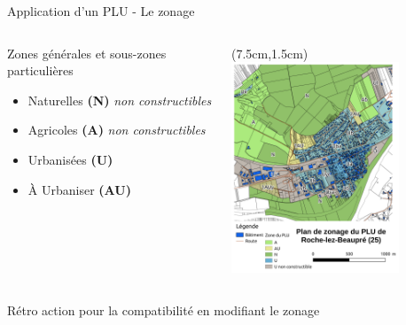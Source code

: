\documentclass[xcolor=table]{beamer}
\begin{document}
\begin{frame}{Application d'un PLU - Le zonage}
\begin{columns}[T]
\begin{column}[T]{7cm}
Zones générales et sous-zones particulières
\begin{itemize}
\item \alert{Naturelles} \textbf{(N)} \emph{non constructibles}
\item \alert{Agricoles} \textbf{(A)} \emph{non constructibles}
\item \alert{Urbanisées} \textbf{(U)}
\item \alert{À Urbaniser} \textbf{(AU)}
\end{itemize}
\end{column}
\begin{column}[T]{4cm}
\begin{textblock*}{6cm}(7.5cm,1.5cm)
\includegraphics[width=5cm]{cartes/plu-roche.png}
\end{textblock*}	
\end{column}
\end{columns}

\end{frame}

\begin{frame}{Rétro action pour la compatibilité en modifiant le zonage}
	
\end{frame}
\end{document}
